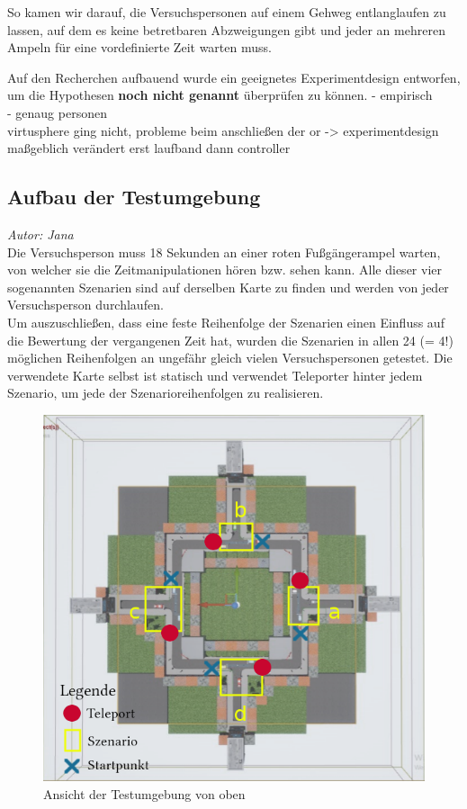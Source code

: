 \documentclass{Bericht}
\begin{document}
		So kamen wir darauf, die Versuchspersonen auf einem Gehweg entlanglaufen zu lassen, auf dem es keine betretbaren Abzweigungen gibt und jeder an mehreren Ampeln für eine vordefinierte Zeit warten muss. 
		
Auf den Recherchen aufbauend wurde ein geeignetes Experimentdesign entworfen, um die Hypothesen \textbf{noch nicht genannt} überprüfen zu können. 
- empirisch \\
- genaug personen \\

virtusphere ging nicht, probleme beim anschließen der or -> experimentdesign maßgeblich verändert 
erst laufband dann controller 


\subsection{Aufbau der Testumgebung}
\textit{Autor: Jana}\\
	 
  Die Versuchsperson muss 18 Sekunden an einer roten Fußgängerampel warten, von welcher sie die Zeitmanipulationen hören bzw. sehen kann.
Alle dieser vier sogenannten Szenarien sind auf derselben Karte zu finden und werden von jeder Versuchsperson durchlaufen.\\
Um auszuschließen, dass eine feste Reihenfolge der Szenarien einen Einfluss auf die Bewertung der vergangenen Zeit hat, wurden die Szenarien in allen 24 (= 4!) möglichen Reihenfolgen an ungefähr gleich vielen Versuchspersonen getestet. Die verwendete Karte selbst ist statisch und verwendet Teleporter hinter jedem Szenario, um jede der Szenarioreihenfolgen zu realisieren.

 
\begin{figure}[H]
	\centering
	\includegraphics[scale=0.7]{../Bilder/mapLegende.png}
	\caption{Ansicht der Testumgebung von oben}
	\label{img:map}
\end{figure}
\end{document}
